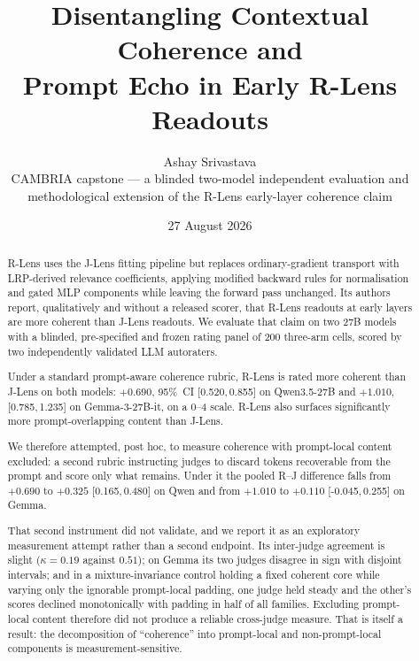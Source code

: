 \documentclass[11pt]{article}
\title{\vspace{-2em}\bfseries Disentangling Contextual Coherence and\\
Prompt Echo in Early R-Lens Readouts}
\author{Ashay Srivastava\\[2pt]
\small CAMBRIA capstone --- a blinded two-model independent evaluation and\\
\small methodological extension of the R-Lens early-layer coherence claim}
\date{\small 27 August 2026}
\newcommand{\ci}[2]{[#1,\,#2]}
\newcommand{\flag}[1]{\textcolor{flagged}{#1}}
\begin{document}
\maketitle
\thispagestyle{fancy}

\begin{abstract}
\noindent
R-Lens uses the J-Lens fitting pipeline but replaces ordinary-gradient transport
with LRP-derived relevance coefficients, applying modified backward rules for
normalisation and gated MLP components while leaving the forward pass unchanged.
Its authors report, qualitatively and without a released scorer, that R-Lens
readouts at early layers are more coherent than J-Lens readouts. We evaluate that claim on two 27B models with a blinded,
pre-specified and frozen rating panel of 200 three-arm cells, scored by two
independently validated LLM autoraters.

Under a standard prompt-aware coherence rubric, R-Lens is rated more coherent
than J-Lens on both models: $+0.690$, 95\%~CI \ci{0.520}{0.855} on Qwen3.5-27B
and $+1.010$, \ci{0.785}{1.235} on Gemma-3-27B-it, on a 0--4 scale. R-Lens also
surfaces significantly more prompt-overlapping content than J-Lens.

We therefore attempted, post hoc, to measure coherence with prompt-local content
excluded: a second rubric instructing judges to discard tokens recoverable from
the prompt and score only what remains. Under it the pooled R--J difference falls
from $+0.690$ to $+0.325$ \ci{0.165}{0.480} on Qwen and from $+1.010$ to $+0.110$
\ci{-0.045}{0.255} on Gemma.

\flag{That second instrument did not validate, and we report it as an exploratory
measurement attempt rather than a second endpoint.} Its inter-judge agreement is
slight ($\kappa = 0.19$ against $0.51$); on Gemma its two judges disagree in sign
with disjoint intervals; and in a mixture-invariance control holding a fixed
coherent core while varying only the ignorable prompt-local padding, one judge
held steady and the other's scores declined monotonically with padding in half of
all families. Excluding prompt-local content therefore did not produce a reliable
cross-judge measure. That is itself a result: the decomposition of ``coherence''
into prompt-local and non-prompt-local components is measurement-sensitive.


\end{abstract}
\end{document}

